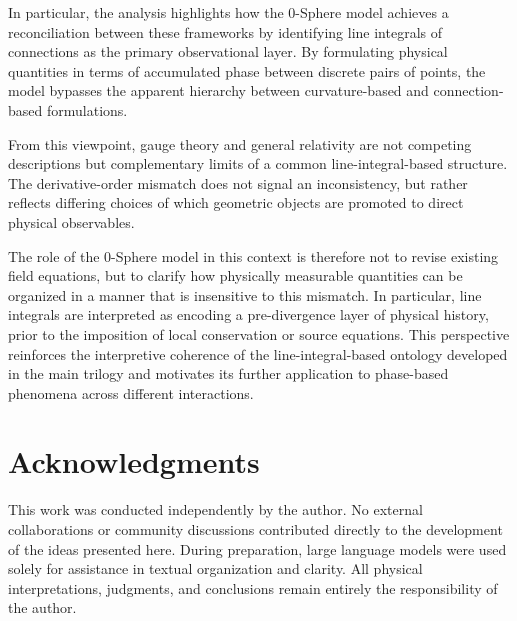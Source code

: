 \documentclass[12pt,letterpaper]{article} %
\begin{document}
In particular, the analysis highlights how the 0-Sphere model achieves a reconciliation between these frameworks by identifying line integrals of connections as the primary observational layer. By formulating physical quantities in terms of accumulated phase between discrete pairs of points, the model bypasses the apparent hierarchy between curvature-based and connection-based formulations.

From this viewpoint, gauge theory and general relativity are not competing descriptions but complementary limits of a common line-integral-based structure. The derivative-order mismatch does not signal an inconsistency, but rather reflects differing choices of which geometric objects are promoted to direct physical observables.

The role of the 0-Sphere model in this context is therefore not to revise existing field equations, but to clarify how physically measurable quantities can be organized in a manner that is insensitive to this mismatch. In particular, line integrals are interpreted as encoding a pre-divergence layer of physical history, prior to the imposition of local conservation or source equations. This perspective reinforces the interpretive coherence of the line-integral-based ontology developed in the main trilogy and motivates its further application to phase-based phenomena across different interactions.

\section*{Acknowledgments}

This work was conducted independently by the author. No external collaborations or community discussions contributed directly to the development of the ideas presented here. During preparation, large language models were used solely for assistance in textual organization and clarity. All physical interpretations, judgments, and conclusions remain entirely the responsibility of the author.
\end{document}
